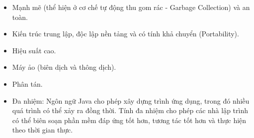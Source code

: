 \begin{enumerate}
\begin{itemize}
        \item Mạnh mẽ (thể hiện ở cơ chế tự động thu gom rác - Garbage Collection) và an toàn.
        \item Kiến trúc trung lập, độc lập nền tảng và có tính khả chuyển (Portability).
        \item Hiệu suất cao.
        \item Máy ảo (biên dịch và thông dịch).
        \item Phân tán.
        \item Đa nhiệm: Ngôn ngữ Java cho phép xây dựng trình ứng dụng, trong đó nhiều quá trình có thể xảy ra đồng thời. Tính đa nhiệm cho phép các nhà lập trình có thể biên soạn phần mềm đáp ứng tốt hơn, tương tác tốt hơn và thực hiện theo thời gian thực.
    \end{itemize}
\end{enumerate}

